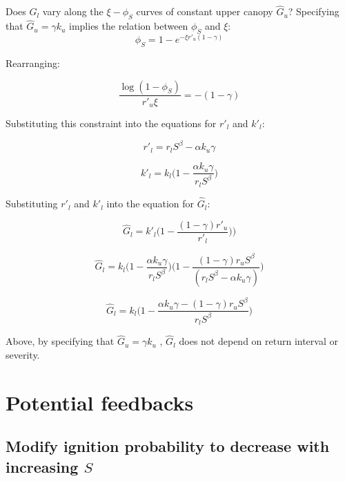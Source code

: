 \documentclass{article}
\begin{document}
Does $G_l$ vary along the $\xi - \phi_S$ curves of constant  upper canopy $\hat G_u$?
Specifying that $\hat G_u = \gamma k_u$ implies the relation between $\phi_S$ and $\xi$:
$$\phi_S = 1- e^{-\xi r'_u (1-\gamma)}$$

Rearranging:

\begin{equation}
\frac{\log(1 - \phi_S)}{  r'_u \xi  }= -  (1 - \gamma )
\end{equation}


 Substituting this constraint into the equations for $r'_l$ and $k'_l$:

\begin{equation}
r'_l= r_l S^\beta   - \alpha k_u \gamma
\end{equation}

\begin{equation}
 k'_l  = k_l  \bigg(1  - \frac{\alpha k_u \gamma} { r_l S^\beta}\bigg)
\end{equation}


Substituting $r'_l$ and $k'_l$ into the equation for $\hat G_l$:

\begin{equation}
\hat{G}_l =
 		k'_l \big( 1 - \frac{(1 - \gamma) r'_u }{r'_l }  ) \big)
\end{equation}


\begin{equation}
\hat{G}_l =
 		  k_l  \bigg(1  - \frac{\alpha k_u \gamma} { r_l S^\beta}\bigg)
		  \bigg( 1 - \frac{(1 - \gamma) r_u  S^\beta }{(r_l S^\beta   - \alpha k_u \gamma)}   \bigg)
\end{equation}


\begin{equation}
\hat{G}_l =
 		  {k_l}
		  \bigg( 1 - \frac{\alpha k_u \gamma - (1 - \gamma) r_u  S^\beta}{r_l S^\beta }  \bigg)
\label{eq:constrained_G_l}
\end{equation}

Above, by specifying that  $\hat G_u = \gamma k_u$ ,  $\hat{G}_l$ does not depend on return interval or severity.


\section{Potential feedbacks}
\subsection{Modify ignition probability to decrease with increasing $S$}
\end{document}
